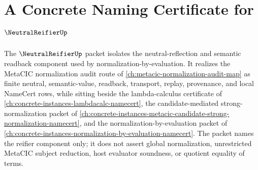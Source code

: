 \chapter{A Concrete Naming Certificate for $\NeutralReifierUp$}
\label{ch:concrete-instances-neutral-reifier-namecert}

The $\NeutralReifierUp$ packet isolates the neutral-reflection and semantic readback component used by normalization-by-evaluation. It realizes the MetaCIC normalization audit route of \autoref{ch:metacic-normalization-audit-map} as finite neutral, semantic-value, readback, transport, replay, provenance, and local NameCert rows, while sitting beside the lambda-calculus certificate of \autoref{ch:concrete-instances-lambdacalc-namecert}, the candidate-mediated strong-normalization packet of \autoref{ch:concrete-instances-metacic-candidate-strong-normalization-namecert}, and the normalization-by-evaluation packet of \autoref{ch:concrete-instances-normalization-by-evaluation-namecert}. The packet names the reifier component only; it does not assert global normalization, unrestricted MetaCIC subject reduction, host evaluator soundness, or quotient equality of terms.

